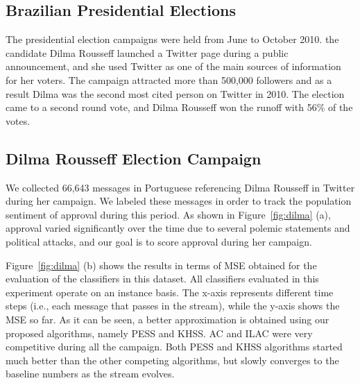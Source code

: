 \subsection{Brazilian Presidential Elections}

The presidential election campaigns were held from June to October 2010.
the candidate Dilma Rousseff launched a Twitter page during a public announcement, and she used Twitter as one of the main sources of information for her voters. The campaign attracted more than 500,000 followers and
as a result Dilma was the second most cited person on Twitter in 2010.
The election came to a second round vote, and Dilma Rousseff won the runoff with 56\% of the votes.

\subsection*{Dilma Rousseff Election Campaign}
We collected 66,643 messages in Portuguese referencing Dilma Rousseff in Twitter during her campaign. We labeled these messages in order to track the population sentiment of approval during this period. As shown in Figure~\ref{fig:dilma} (a), approval varied significantly over the time due to several polemic statements and political attacks, and our goal is to score approval during her campaign.

Figure~\ref{fig:dilma} (b) shows the results in terms of MSE obtained for the evaluation of the classifiers in this dataset. All classifiers evaluated in this experiment operate on an instance basis.
The x-axis represents different time steps (i.e., each message that
passes in the stream), while the y-axis shows the MSE so far.
As it can be seen, a better approximation is obtained using our proposed algorithms, namely PESS and KHSS.
AC and ILAC were very competitive during all the campaign. Both PESS and KHSS algorithms started much better than the other competing algorithms, but slowly converges to the baseline numbers as the stream evolves.

